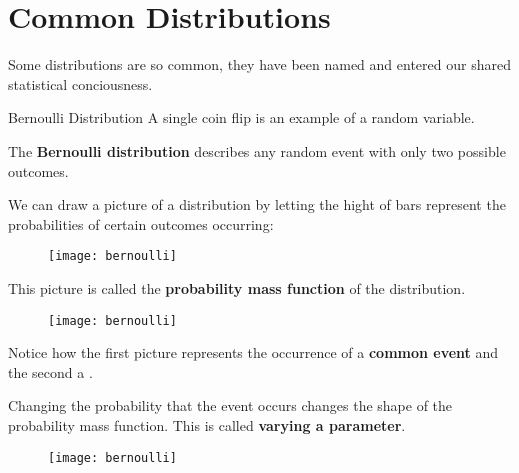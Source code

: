 \section{Common Distributions}

\begin{frame}
Some distributions are so common, they have been named and entered our shared
statistical conciousness.
\end{frame}
%

%
\begin{frame}{Bernoulli Distribution}
A single coin flip is an example of a  random
variable.

\hfill

The \textbf{Bernoulli distribution} describes any random event with only two possible
outcomes.
\end{frame}
%

%
\begin{frame}

We can draw a picture of a distribution by letting the hight of bars represent
the probabilities of certain outcomes occurring:

  \begin{figure}
    \texttt{[image: bernoulli]}
  \end{figure}

This picture is called the \textbf{probability mass function} of the
distribution.
\end{frame}
%

%
\begin{frame}

  \begin{figure}
    \texttt{[image: bernoulli]}
  \end{figure}

Notice how the first picture represents the occurrence of a \textbf{common event}
and the second a .

\end{frame}
%

%
\begin{frame}

Changing the probability that the event occurs changes the shape of the
probability mass function. This is called \textbf{varying a parameter}.

  \begin{figure}
    \texttt{[image: bernoulli]}
  \end{figure}

\end{frame}
%

